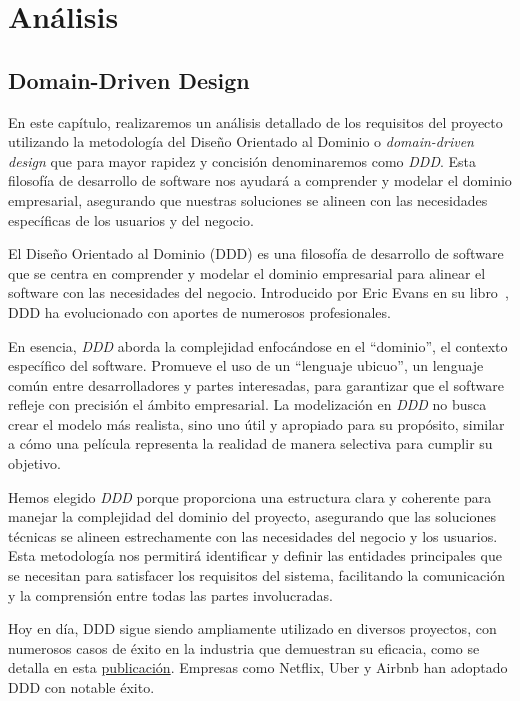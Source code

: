 \chapter{Análisis}

\section{Domain-Driven Design}

En este capítulo, realizaremos un análisis detallado de los requisitos del proyecto utilizando la metodología del Diseño Orientado al Dominio o \textit{domain-driven design} que para mayor rapidez y concisión denominaremos como \textit{DDD}. Esta filosofía de desarrollo de software nos ayudará a comprender y modelar el dominio empresarial, asegurando que nuestras soluciones se alineen con las necesidades específicas de los usuarios y del negocio.

El Diseño Orientado al Dominio (DDD) es una filosofía de desarrollo de software que se centra en comprender y modelar el dominio empresarial para alinear el software con las necesidades del negocio. Introducido por Eric Evans en su libro~\cite{evans2004domain}, DDD ha evolucionado con aportes de numerosos profesionales.

En esencia, \textit{DDD} aborda la complejidad enfocándose en el ``dominio'', el contexto específico del software. Promueve el uso de un ``lenguaje ubicuo'', un lenguaje común entre desarrolladores y partes interesadas, para garantizar que el software refleje con precisión el ámbito empresarial. La modelización en \textit{DDD} no busca crear el modelo más realista, sino uno útil y apropiado para su propósito, similar a cómo una película representa la realidad de manera selectiva para cumplir su objetivo.

Hemos elegido \textit{DDD} porque proporciona una estructura clara y coherente para manejar la complejidad del dominio del proyecto, asegurando que las soluciones técnicas se alineen estrechamente con las necesidades del negocio y los usuarios. Esta metodología nos permitirá identificar y definir las entidades principales que se necesitan para satisfacer los requisitos del sistema, facilitando la comunicación y la comprensión entre todas las partes involucradas.

Hoy en día, DDD sigue siendo ampliamente utilizado en diversos proyectos, con numerosos casos de éxito en la industria que demuestran su eficacia, como se detalla en esta \href{https://blog.bitsrc.io/demystifying-domain-driven-design-ddd-in-modern-software-architecture-b57e27c210f7}{publicación}. Empresas como Netflix, Uber y Airbnb han adoptado DDD con notable éxito.

